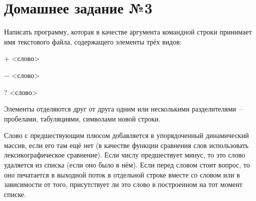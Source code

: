 \section*{Домашнее задание №3}


Написать программу, которая в качестве аргумента командной строки
принимает имя текстового файла, содержащего элементы трёх видов:
\begin{description}
\item{$+$} <слово>
\item{$-$} <слово>
\item{$?$} <слово>
\end{description}

Элементы отделяются друг от друга одним или несколькими
разделителями~-- пробелами, табуляциями, символами новой строки.

Слово
с предшествующим плюсом добавляется в упорядоченный динамический
массив, если его там ещё нет (в качестве функции сравнения слов
использовать лексикографическое сравнение). Если числу предшествует
минус, то это слово удаляется из списка (если оно было в нём). Если перед
словом стоит вопрос, то оно печатается в выходной поток в отдельной
строке вместе со словом  или  в зависимости от того, присутствует ли
это слово в построенном на тот момент списке.
